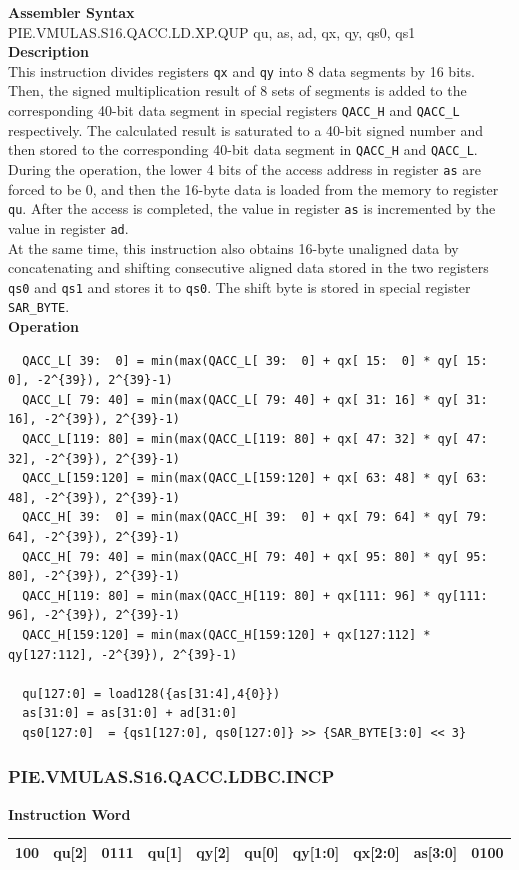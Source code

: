 \textbf{Assembler Syntax} \\
PIE.VMULAS.S16.QACC.LD.XP.QUP qu, as, ad, qx, qy, qs0, qs1 \\
\textbf{Description} \\
This instruction divides registers \lstinline{qx} and \lstinline{qy} into 8 data segments by 16 bits. Then, the signed multiplication result of 8 sets of segments is added to the corresponding 40-bit data segment in special registers \lstinline{QACC_H} and \lstinline{QACC_L} respectively. The calculated result is saturated to a 40-bit signed number and then stored to the corresponding 40-bit data segment in \lstinline{QACC_H} and \lstinline{QACC_L}.\\
During the operation, the lower 4 bits of the access address in register \lstinline{as} are forced to be 0, and then the 16-byte data is loaded from the memory to register \lstinline{qu}. After the access is completed, the value in register \lstinline{as} is incremented by the value in register \lstinline{ad}.\\
At the same time, this instruction also obtains 16-byte unaligned data by concatenating and shifting consecutive aligned data stored in the two registers \lstinline{qs0} and \lstinline{qs1} and stores it to \lstinline{qs0}. The shift byte is stored in special register \lstinline{SAR_BYTE}.\\
\textbf{Operation}
\begin{lstlisting}
  QACC_L[ 39:  0] = min(max(QACC_L[ 39:  0] + qx[ 15:  0] * qy[ 15:  0], -2^{39}), 2^{39}-1)
  QACC_L[ 79: 40] = min(max(QACC_L[ 79: 40] + qx[ 31: 16] * qy[ 31: 16], -2^{39}), 2^{39}-1)
  QACC_L[119: 80] = min(max(QACC_L[119: 80] + qx[ 47: 32] * qy[ 47: 32], -2^{39}), 2^{39}-1)
  QACC_L[159:120] = min(max(QACC_L[159:120] + qx[ 63: 48] * qy[ 63: 48], -2^{39}), 2^{39}-1)
  QACC_H[ 39:  0] = min(max(QACC_H[ 39:  0] + qx[ 79: 64] * qy[ 79: 64], -2^{39}), 2^{39}-1)
  QACC_H[ 79: 40] = min(max(QACC_H[ 79: 40] + qx[ 95: 80] * qy[ 95: 80], -2^{39}), 2^{39}-1)
  QACC_H[119: 80] = min(max(QACC_H[119: 80] + qx[111: 96] * qy[111: 96], -2^{39}), 2^{39}-1)
  QACC_H[159:120] = min(max(QACC_H[159:120] + qx[127:112] * qy[127:112], -2^{39}), 2^{39}-1)

  qu[127:0] = load128({as[31:4],4{0}})
  as[31:0] = as[31:0] + ad[31:0]
  qs0[127:0]  = {qs1[127:0], qs0[127:0]} >> {SAR_BYTE[3:0] << 3}
\end{lstlisting}

\newpage
\subsubsection{PIE.VMULAS.S16.QACC.LDBC.INCP}\label{instruction:PIEVMULASS16QACCLDBCINCP}
\setlength\tabcolsep{6pt}
\textbf{Instruction Word} \\
\begin{tabular}{|c|c|c|c|c|c|c|c|c|c|}
	\hline
	100 & qu[2] & 0111 & qu[1] & qy[2] & qu[0] & qy[1:0] & qx[2:0] & as[3:0] & 0100 \\
	\hline
\end{tabular}

